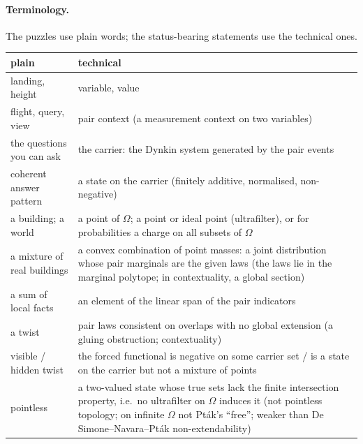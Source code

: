 \documentclass[11pt]{article}
\begin{document}
\paragraph{Terminology.} The puzzles use plain words; the status-bearing
statements use the technical ones.
\begin{center}\small
\begin{tabular}{|>{\raggedright\arraybackslash}p{4.6cm}|>{\raggedright\arraybackslash}p{8.4cm}|}
\hline
\textbf{plain} & \textbf{technical}\\\hline
landing, height & variable, value\\\hline
flight, query, view & pair context (a measurement context on two variables)\\\hline
the questions you can ask & the carrier: the Dynkin system generated by the pair events\\\hline
coherent answer pattern & a state on the carrier (finitely additive, normalised, non-negative)\\\hline
a building; a world & a point of $\Omega$; a point or ideal point (ultrafilter), or for probabilities a charge on all subsets of $\Omega$\\\hline
a mixture of real buildings & a convex combination of point masses: a joint distribution whose pair marginals are the given laws (the laws lie in the marginal polytope; in contextuality, a global section)\\\hline
a sum of local facts & an element of the linear span of the pair indicators\\\hline
a twist & pair laws consistent on overlaps with no global extension (a gluing obstruction; contextuality)\\\hline
visible / hidden twist & the forced functional is negative on some carrier set / is a state on the carrier but not a mixture of points\\\hline
pointless & a two-valued state whose true sets lack the finite intersection property, i.e.\ no ultrafilter on $\Omega$ induces it (not pointless topology; on infinite $\Omega$ not Pt\'ak's ``free''; weaker than De Simone--Navara--Pt\'ak non-extendability)\\\hline
\end{tabular}
\end{center}
\end{document}
